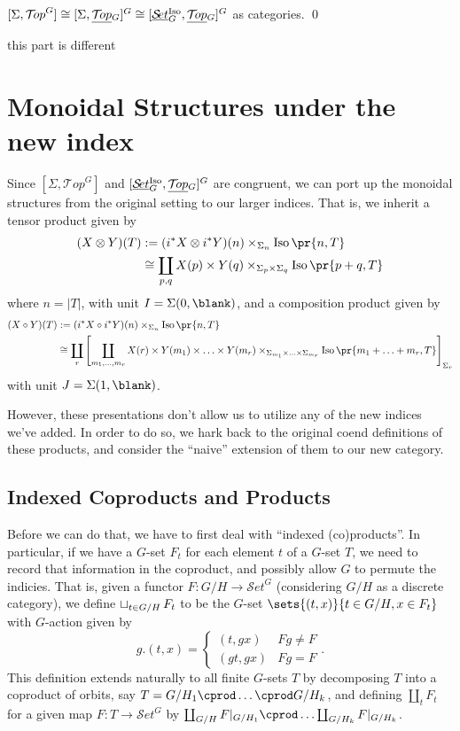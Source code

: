 \documentclass{report}
\newcommand{\Top}{\text{$\mathcal{T}\!op$}}
\newcommand{\Set}{\text{$\mathcal{S}\!et$}}
\DeclareMathOperator{\Iso}{Iso}
\newcommand{\iso}[1]{\text{$\Iso\pr{#1}$}}
\newcommand{\TopG}{\text{\underline{$\Top$}$_G$}}
\newcommand{\SetG}{\text{\underline{$\Set$}$_G^{\mbox{\scriptsize Iso}}$}}
\renewcommand{\ST}{\text{$[\SetG,\TopG]^G$}}
\newcommand{\ico}{\operatornamewithlimits{\sqcup}}
\begin{document}
\begin{cor}
  $[\Sigma,\Top^G]\cong[\Sigma,\TopG]^G\cong\ST$ as categories. \qed
\end{cor}

this part is different

\section{Monoidal Structures under the new index}
Since $[\Sigma,\Top^G]$ and $\ST$ are congruent, we can port up the monoidal structures from the original setting to our larger indices. That is, we inherit a tensor product given by
\begin{align*}
  (X\otimes Y)(T) &:= (i^*X\otimes i^*Y)(n)\times_{\Sigma_n}\iso{n,T}\\
  &\cong \coprod_{p,q}X(p)\times Y(q)\times_{\Sigma_p\times \Sigma_q}\iso{p+q,T}
\end{align*}
where $n = |T|$, with unit $I = \Sigma(0,\blank)$, 
and a composition product given by
\begin{align*}
  (X\circ Y)(T) &:= (i^*X\circ i^*Y)(n)\times_{\Sigma_n}\iso{n,T}\\
  &\cong \coprod_r\left[\coprod_{m_1,\ldots,m_r}X(r)\times Y(m_1)\times\ldots\times Y(m_r)\times_{\Sigma_{m_1}\times\ldots\times\Sigma_{m_r}}\iso{m_1+\ldots+m_r,T}\right]_{\Sigma_r}
\end{align*}
with unit $J = \Sigma(1,\blank)$.

However, these presentations don't allow us to utilize any of the new indices we've added. In order to do so, we hark back to the original coend definitions of these products, and consider the ``naive'' extension of them to our new category. 


\subsection{Indexed Coproducts and Products}
Before we can do that, we have to first deal with ``indexed (co)products''. In particular, if we have a $G$-set $F_t$ for each element $t$ of a $G$-set $T$, we need to record that information in the coproduct, and possibly allow $G$ to permute the indicies. That is, given a functor $F: G/H\to \Set^G$ (considering $G/H$ as a discrete category), we define $\ico_{t\in G/H}F_t$ to be the $G$-set $\sets{(t,x)}{t\in G/H, x\in F_t}$ with $G$-action given by 
\[g.(t,x) = \left\{\begin{array}{lr}(t,gx) & Fg\neq F\\ (gt,gx) & Fg = F\end{array}\right. .\]
This definition extends naturally to all finite $G$-sets $T$ by decomposing $T$ into a coproduct of orbits, say $T = G/H_1\cprod\ldots\cprod G/H_k$, and defining $\coprod_tF_t$ for a given map $F: T\to \Set^G$ by $\coprod_{G/H}F|_{G/H_1}\cprod \ldots \coprod_{G/H_k}F|_{G/H_k}$. 
\end{document}
